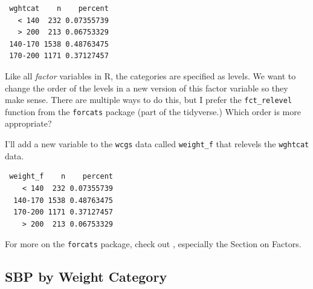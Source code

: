 \documentclass[
]{book}
\newenvironment{Shaded}{\begin{snugshade}}{\end{snugshade}}
\newcommand{\DataTypeTok}[1]{\textcolor[rgb]{0.13,0.29,0.53}{#1}}
\newcommand{\KeywordTok}[1]{\textcolor[rgb]{0.13,0.29,0.53}{\textbf{#1}}}
\newcommand{\NormalTok}[1]{#1}
\newcommand{\OperatorTok}[1]{\textcolor[rgb]{0.81,0.36,0.00}{\textbf{#1}}}
\newcommand{\StringTok}[1]{\textcolor[rgb]{0.31,0.60,0.02}{#1}}
\begin{document}
\begin{Shaded}
\end{Shaded}

\begin{verbatim}
 wghtcat    n    percent
   < 140  232 0.07355739
   > 200  213 0.06753329
 140-170 1538 0.48763475
 170-200 1171 0.37127457
\end{verbatim}

Like all \emph{factor} variables in R, the categories are specified as levels. We want to change the order of the levels in a new version of this factor variable so they make sense. There are multiple ways to do this, but I prefer the \texttt{fct\_relevel} function from the \texttt{forcats} package (part of the tidyverse.) Which order is more appropriate?

I'll add a new variable to the \texttt{wcgs} data called \texttt{weight\_f} that relevels the \texttt{wghtcat} data.

\begin{Shaded}
\end{Shaded}

\begin{verbatim}
 weight_f    n    percent
    < 140  232 0.07355739
  140-170 1538 0.48763475
  170-200 1171 0.37127457
    > 200  213 0.06753329
\end{verbatim}

For more on the \texttt{forcats} package, check out \citet{R4DS}, especially the Section on Factors.

\hypertarget{sbp-by-weight-category}{%
\subsection{SBP by Weight Category}\label{sbp-by-weight-category}}
\end{document}
